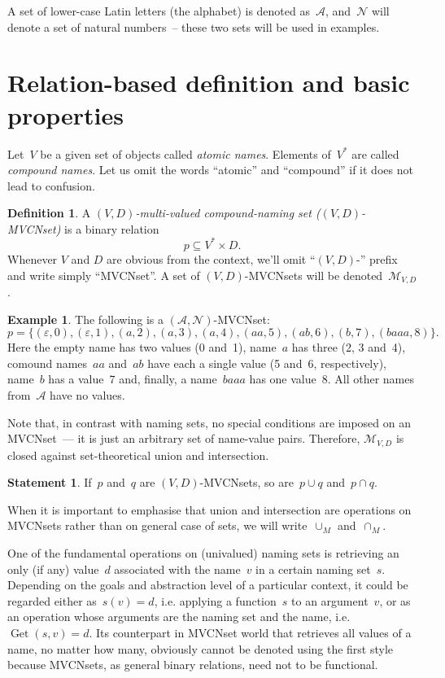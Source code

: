 \documentclass{article}
\theoremstyle{definition}
\newtheorem{Df}{Definition}
\newtheorem{St}{Statement}
\newtheorem{Ex}{Example}
\newcommand{\setcharmvcn}{M}
\newcommand{\setsymbol}[3]{\mathcal{#1}_{#2,#3}}
\newcommand{\setmvcn}[2]{\setsymbol{\setcharmvcn}{#1}{#2}}
\newcommand{\seta}{\mathcal{A}}
\newcommand{\setn}{\mathcal{N}}
\newcommand{\deref}{\operatorname{Get}}
\begin{document}
A set of lower-case Latin letters (the alphabet) is denoted as~$\seta$,
and~$\setn$ will denote a set of natural numbers~-- these two sets will be
used in examples.



\section{Relation-based definition and basic properties}

Let~$V$ be a given set of objects called \emph{atomic names}. Elements
of~$V^\ast$ are called \emph{compound names}. Let us omit the words ``atomic''
and ``compound'' if it does not lead to confusion.

\begin{Df}\label{df:mvcn}
A \emph{$(V,D)$-multi-valued compound-naming set ($(V,D)$-MVCNset)} is a binary
relation
\[
  p \subseteq V^\ast \times D .
\]
Whenever $V$ and $D$ are obvious from the context, we'll omit ``$(V,D)$-''
prefix and write simply ``MVCNset''. A set of $(V,D)$-MVCNsets will be
denoted~$\setmvcn{V}{D}$.
\end{Df}

\begin{Ex}\label{ex:mvcn}
The following is a $(\seta, \setn)$-MVCNset:
\[
  p = \{
    (\varepsilon, 0),
    (\varepsilon, 1),
    (a,           2),
    (a,           3),
    (a,           4),
    (aa,          5),
    (ab,          6),
    (b,           7),
    (baaa,        8)
  \} .
\]
Here the empty name has two values (0 and~1), name~$a$ has three (2, 3 and~4),
comound names~$aa$ and~$ab$ have each a single value (5 and~6, respectively),
name~$b$ has a value~7 and, finally, a name~$baaa$ has one value~8. All other
names from~$\seta$ have no values.
\end{Ex}

Note that, in contrast with naming sets, no special conditions are imposed
on an MVCNset~--- it is just an arbitrary set of name-value pairs.
Therefore, $\setmvcn{V}{D}$ is closed against set-theoretical union
and intersection.
\begin{St}\label{st:mvcn-setop}
If~$p$ and~$q$ are $(V,D)$-MVCNsets, so are~$p\cup q$ and~$p\cap q$.
\end{St}

When it is important to emphasise that union and intersection are operations
on MVCNsets rather than on general case of sets, we will
write~$\cup_\setcharmvcn$ and~$\cap_\setcharmvcn$.

One of the fundamental operations on (univalued) naming sets is retrieving
an only (if any) value~$d$ associated with the name~$v$ in a certain naming
set~$s$.  Depending on the goals and abstraction level of a particular
context, it could be regarded either as~$s(v)=d$, i.e. applying a function~$s$
to an argument~$v$, or as an operation whose arguments are the naming set and
the name, i.e.~$\deref(s, v)=d$. Its counterpart in MVCNset world that
retrieves all values of a name, no matter how many, obviously cannot be denoted
using the first style because MVCNsets, as general binary relations, need not
to be functional.
\end{document}
